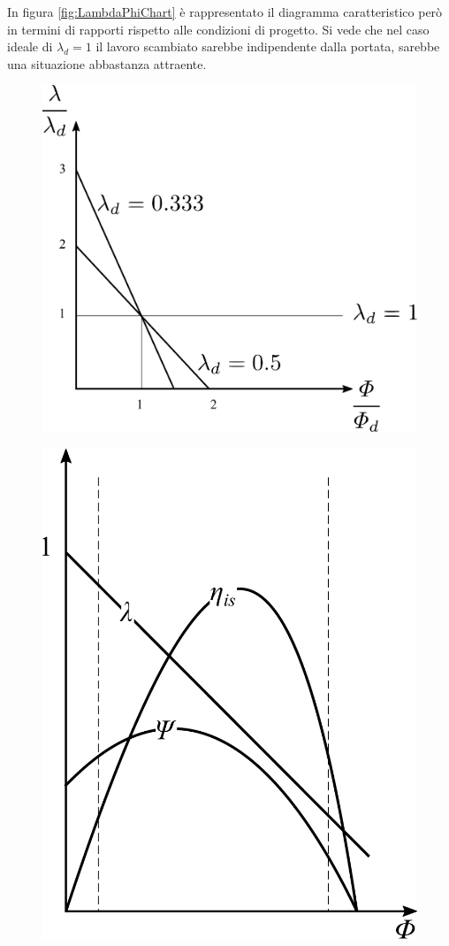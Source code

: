 In figura \ref{fig:LambdaPhiChart} è rappresentato il diagramma caratteristico però in termini di rapporti rispetto alle condizioni di progetto. Si vede che nel caso ideale di $\lambda_d = 1$ il lavoro scambiato sarebbe indipendente dalla portata, sarebbe una situazione abbastanza attraente. 
\begin{figure}
\centering
\begin{minipage}{.5\textwidth}
  \centering
  \includegraphics[width=.9\linewidth]{fig/LambdaPhiChart.pdf}
  \label{fig:LambdaPhiChart}
\end{minipage}%
\begin{minipage}{.5\textwidth}
  \centering
  \includegraphics[width=.9\linewidth]{fig/CarattReal.pdf}
  \label{fig:CarattReal}
\end{minipage}
\end{figure}
